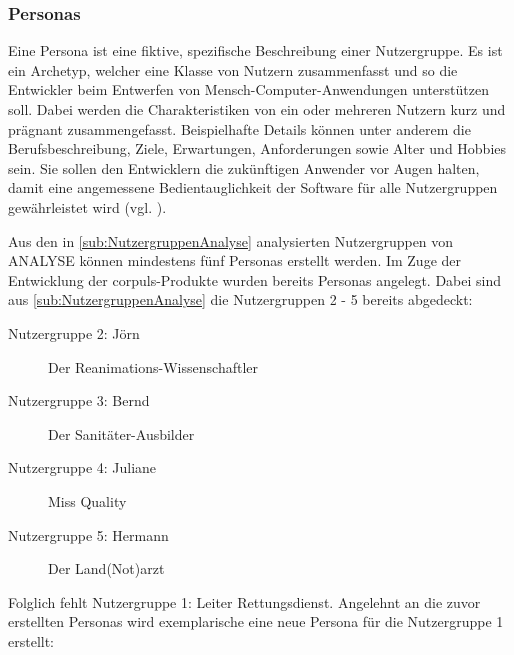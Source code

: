 \subsubsection{Personas}
Eine Persona ist eine fiktive, spezifische Beschreibung einer Nutzergruppe.
Es ist ein \gls{Archetyp}, welcher eine Klasse von Nutzern zusammenfasst und so die Entwickler beim Entwerfen von Mensch-Computer-Anwendungen unterstützen soll.
Dabei werden die Charakteristiken von ein oder mehreren Nutzern kurz und prägnant zusammengefasst.
Beispielhafte Details können unter anderem die Berufsbeschreibung, Ziele, Erwartungen, Anforderungen sowie Alter und Hobbies sein.
Sie sollen den Entwicklern die zukünftigen Anwender vor Augen halten, damit eine angemessene Bedientauglichkeit der Software für alle Nutzergruppen gewährleistet wird (vgl. \cite[3.2, S.11]{Karwowski.2011,Pruitt.2006}).

Aus den in \ref{sub:NutzergruppenAnalyse} analysierten Nutzergruppen von \gls{ANALYSE} können mindestens fünf Personas erstellt werden.
Im Zuge der Entwicklung der \textsf{corpuls\color{corpulsred}{.web}}-Produkte wurden bereits Personas angelegt.
Dabei sind aus \ref{sub:NutzergruppenAnalyse} die Nutzergruppen 2 - 5 bereits abgedeckt:
\begin{description}
\item[Nutzergruppe 2: Jörn]
	\glqq Der Reanimations-Wissenschaftler\grqq 
\item[Nutzergruppe 3: Bernd]
	\glqq Der Sanitäter-Ausbilder\grqq 
\item[Nutzergruppe 4: Juliane]
	\glqq Miss Quality\grqq
\item[Nutzergruppe 5: Hermann]
	\glqq Der Land(Not)arzt\grqq
\end{description}

Folglich fehlt Nutzergruppe 1: Leiter Rettungsdienst.
Angelehnt an die zuvor erstellten Personas wird exemplarische eine neue Persona für die Nutzergruppe 1 erstellt:

